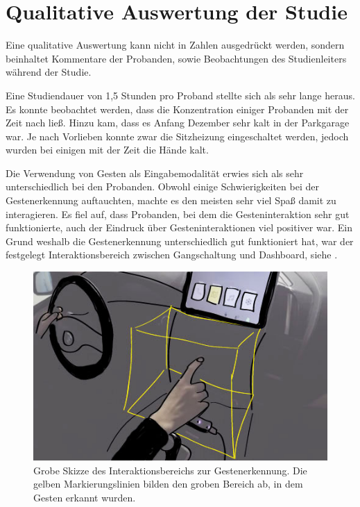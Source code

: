 \section[Qualitative Auswertung]{Qualitative Auswertung der Studie}
Eine qualitative Auswertung kann nicht in Zahlen ausgedrückt werden, sondern beinhaltet Kommentare der Probanden, sowie Beobachtungen des Studienleiters während der Studie.

Eine Studiendauer von 1,5 Stunden pro Proband stellte sich als sehr lange heraus. 
Es konnte beobachtet werden, dass die Konzentration einiger Probanden mit der Zeit nach ließ. 
Hinzu kam, dass es Anfang Dezember sehr kalt in der Parkgarage war. 
Je nach Vorlieben konnte zwar die Sitzheizung eingeschaltet werden, jedoch wurden bei einigen mit der Zeit die Hände kalt. 

Die Verwendung von Gesten als Eingabemodalität erwies sich als sehr unterschiedlich bei den Probanden. 
Obwohl einige Schwierigkeiten bei der Gestenerkennung auftauchten, machte es den meisten sehr viel Spaß damit zu interagieren. 
Es fiel auf, dass Probanden, bei dem die Gesteninteraktion sehr gut funktionierte, auch der Eindruck über Gesteninteraktionen viel positiver war. 
Ein Grund weshalb die Gestenerkennung unterschiedlich gut funktioniert hat, war der festgelegt Interaktionsbereich zwischen Gangschaltung und Dashboard, siehe . 
\begin{figure}
	\centering
		\includegraphics[width=1\textwidth]{img/GestenbereichSkizze2.jpg}
	\caption[Skizze des Interaktionsbereichs zur Gestenerkennung]{Grobe Skizze des Interaktionsbereichs zur Gestenerkennung. Die gelben Markierungslinien bilden den groben Bereich ab, in dem Gesten erkannt wurden.}
	\label{fig:GestenbereichSkizze}
\end{figure}


